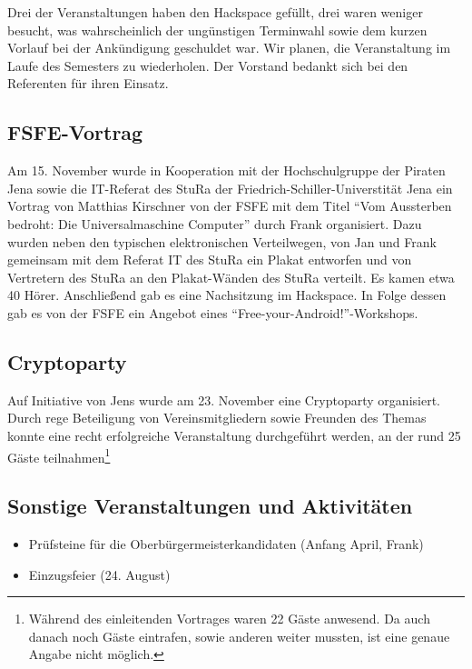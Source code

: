 \documentclass[10pt,DIV16]{scrartcl}
\begin{document}
Drei der Veranstaltungen haben den Hackspace gefüllt, drei waren weniger
besucht, was wahrscheinlich der ungünstigen Terminwahl sowie dem kurzen
Vorlauf bei der Ankündigung geschuldet war.  Wir planen, die Veranstaltung im
Laufe des Semesters zu wiederholen.  Der Vorstand bedankt sich bei den
Referenten für ihren Einsatz.

\subsection{FSFE-Vortrag}

Am 15. November wurde in Kooperation mit der Hochschulgruppe der
Piraten Jena sowie die IT-Referat des StuRa der
Friedrich-Schiller-Universtität Jena ein Vortrag von Matthias
Kirschner von der FSFE mit dem Titel "`Vom Aussterben bedroht: Die
Universalmaschine Computer"' durch Frank organisiert.  Dazu wurden
neben den typischen elektronischen Verteilwegen, von Jan und Frank
gemeinsam mit dem Referat IT des StuRa ein Plakat entworfen und von
Vertretern des StuRa an den Plakat-Wänden des StuRa verteilt. Es
kamen etwa 40 Hörer. Anschließend gab es eine Nachsitzung im
Hackspace. In Folge dessen gab es von der FSFE ein Angebot eines
"`Free-your-Android!"'-Workshops.

\subsection{Cryptoparty}

Auf Initiative von Jens wurde am 23. November eine Cryptoparty organisiert.
Durch rege Beteiligung von Vereinsmitgliedern sowie Freunden des Themas konnte
eine recht erfolgreiche Veranstaltung durchgeführt werden, an der rund 25
Gäste teilnahmen\footnote{Während des einleitenden Vortrages waren 22 Gäste
anwesend. Da auch danach noch Gäste eintrafen, sowie anderen weiter mussten,
ist eine genaue Angabe nicht möglich.}

\subsection{Sonstige Veranstaltungen und Aktivitäten}

\begin{itemize}
	\item Prüfsteine für die Oberbürgermeisterkandidaten (Anfang April, Frank)
	\item Einzugsfeier (24. August)
\end{itemize}


\end{document}
